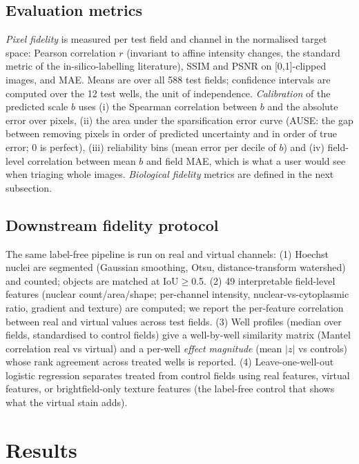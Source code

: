 \documentclass[11pt,a4paper]{article}
\begin{document}
\subsection{Evaluation metrics}
\emph{Pixel fidelity} is measured per test field and channel in the normalised target space: Pearson correlation $r$ (invariant to affine intensity changes, the standard metric of the in-silico-labelling literature), SSIM and PSNR on [0,1]-clipped images, and MAE. Means are over all 588 test fields; confidence intervals are computed over the 12 test wells, the unit of independence. \emph{Calibration} of the predicted scale $b$ uses (i) the Spearman correlation between $b$ and the absolute error over pixels, (ii) the area under the sparsification error curve (AUSE: the gap between removing pixels in order of predicted uncertainty and in order of true error; 0 is perfect), (iii) reliability bins (mean error per decile of $b$) and (iv) field-level correlation between mean $b$ and field MAE, which is what a user would see when triaging whole images. \emph{Biological fidelity} metrics are defined in the next subsection.

\subsection{Downstream fidelity protocol}
The same label-free pipeline is run on real and virtual channels: (1) Hoechst nuclei are segmented (Gaussian smoothing, Otsu, distance-transform watershed) and counted; objects are matched at IoU$\ge$0.5. (2) 49 interpretable field-level features (nuclear count/area/shape; per-channel intensity, nuclear-vs-cytoplasmic ratio, gradient and texture) are computed; we report the per-feature correlation between real and virtual values across test fields. (3) Well profiles (median over fields, standardised to control fields) give a well-by-well similarity matrix (Mantel correlation real vs virtual) and a per-well \emph{effect magnitude} (mean $|z|$ vs controls) whose rank agreement across treated wells is reported. (4) Leave-one-well-out logistic regression separates treated from control fields using real features, virtual features, or brightfield-only texture features (the label-free control that shows what the virtual stain adds).

\section{Results}
\label{sec:results}
\end{document}

